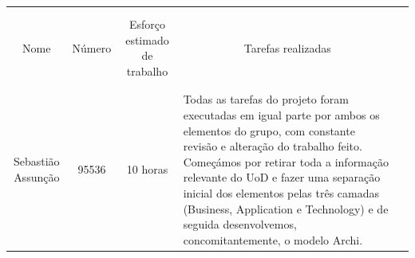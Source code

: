 \documentclass{article}
\begin{document}
    \begin{table}[H]
        \centering
        \begin{tabular}{|l|l|l|l|l}
        \cline{1-4}
        \multicolumn{1}{|l|}{}                   & \multicolumn{1}{l|}{}       & \multicolumn{1}{l|}{}                             & \multicolumn{1}{l|}{}                   &  \\
        \multicolumn{1}{|l|}{}                   & \multicolumn{1}{l|}{}       & \multicolumn{1}{l|}{}                             & \multicolumn{1}{l|}{}                   &  \\
        \multicolumn{1}{|c|}{Nome}               & \multicolumn{1}{c|}{Número} & \multicolumn{1}{c|}{Esforço estimado de trabalho} & \multicolumn{1}{c|}{Tarefas realizadas} &  \\
        \multicolumn{1}{|l|}{}                   & \multicolumn{1}{l|}{}       & \multicolumn{1}{l|}{}                             & \multicolumn{1}{l|}{}                   &  \\
        \multicolumn{1}{|l|}{}                   & \multicolumn{1}{l|}{}       & \multicolumn{1}{l|}{}                             & \multicolumn{1}{l|}{}                   &  \\ \cline{1-4}
        \multicolumn{1}{|l|}{}                   & \multicolumn{1}{l|}{}       & \multicolumn{1}{l|}{}                             & \multirow{10}{7cm}{Todas as tarefas do projeto foram executadas em igual parte por ambos os elementos do grupo, com constante revisão e alteração do trabalho feito.
        Começámos por retirar toda a informação relevante do UoD e fazer uma separação inicial dos elementos pelas três camadas (Business, Application e Technology) e  de seguida desenvolvemos, concomitantemente, o modelo Archi.}                   &   \\
        \multicolumn{1}{|l|}{}                   & \multicolumn{1}{l|}{}       & \multicolumn{1}{l|}{}                             & \multicolumn{1}{l|}{}                   &  \\
        \multicolumn{1}{|c|}{Sebastião Assunção} & \multicolumn{1}{c|}{95536}  & \multicolumn{1}{c|}{10 horas}                     & \multicolumn{1}{l|}{}                   &  \\
        \multicolumn{1}{|l|}{}                   & \multicolumn{1}{l|}{}       & \multicolumn{1}{l|}{}                             & \multicolumn{1}{l|}{}                   &  \\
        \multicolumn{1}{|l|}{}                   & \multicolumn{1}{l|}{}       & \multicolumn{1}{l|}{}                             & \multicolumn{1}{l|}{}                   &  \\ \cline{1-3}

\end{tabular}
\end{table}
\end{document}
